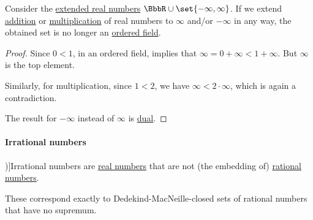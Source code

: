 \begin{proposition}\label{thm:extended_real_numbers_are_not_field}
  Consider the \hyperref[def:extended_real_numbers]{extended real numbers} \( \BbbR \cup \set{ -\infty, \infty } \). If we extend \hyperref[def:real_number_arithmetic/addition]{addition} or \hyperref[def:real_number_arithmetic/multiplication]{multiplication} of real numbers to \( \infty \) and/or \( -\infty \) in any way, the obtained set is no longer an \hyperref[def:ordered_semiring]{ordered field}.
\end{proposition}
\begin{proof}
  Since \( 0 < 1 \), in an ordered field,  implies that \( \infty = 0 + \infty < 1 + \infty \). But \( \infty \) is the top element.

  Similarly, for multiplication, since \( 1 < 2 \), we have \( \infty < 2 \cdot \infty \), which is again a contradiction.

  The result for \( -\infty \) instead of \( \infty \) is \hyperref[def:semilattice/duality]{dual}.
\end{proof}

\paragraph{Irrational numbers}

\begin{definition}\label{def:irrational_numbers}\mimprovised
  \term[ru=иррациональные числа (\cite[36]{Александров1977Введение})]{Irrational numbers} are \hyperref[def:real_numbers]{real numbers} that are not (the embedding of) \hyperref[def:rational_numbers]{rational numbers}.
\end{definition}
\begin{comments}
  \item These correspond exactly to Dedekind-MacNeille-closed sets of rational numbers that have no supremum.
\end{comments}

